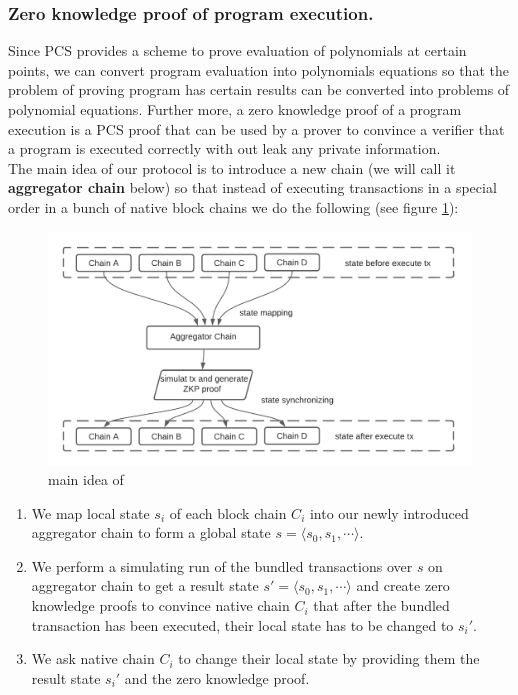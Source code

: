 \documentclass[pageno]{jpaper}
\begin{document}
\subsubsection{Zero knowledge proof of program execution.}
Since PCS provides a scheme to prove evaluation of polynomials at certain points, we can convert program evaluation into polynomials equations so that the problem of proving program has certain results can be converted into problems of polynomial equations. Further more, a zero knowledge proof of a program execution is a PCS proof that can be used by a prover to convince a verifier that a program is executed correctly with out leak any private information.\\
\newline
The main idea of our protocol is to introduce a new chain (we will call it {\bf aggregator chain} below) so that instead of executing transactions in a special order in a bunch of native block chains we do the following (see figure \ref{main-idea}):

\begin{figure}[!ht]
\caption{main idea of \dprotocol}
\label{main-idea}
\includegraphics[scale=0.4]{main-idea}
\end{figure}
\begin{enumerate}[leftmargin=*]
\item We map local state $s_i$ of each block chain $C_i$ into our newly introduced aggregator chain to form a global state $s = \langle s_0, s_1, \cdots \rangle$.
\item We perform a simulating run of the bundled transactions over $s$ on aggregator chain to get a result state $s' = \langle s_0, s_1, \cdots \rangle$ and create zero knowledge proofs to convince native chain $C_i$ that after the bundled transaction has been executed, their local state has to be changed to $s_i'$.
\item We ask native chain $C_i$ to change their local state by providing them the result state $s_i'$ and the zero knowledge proof.
\end{enumerate}
\end{document}
